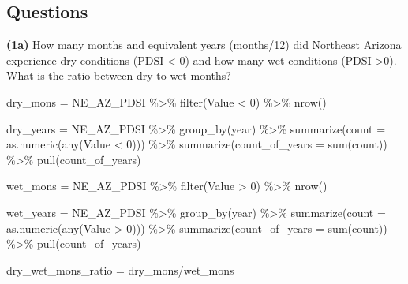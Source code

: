 \documentclass[
  letterpaper,
  DIV=11,
  numbers=noendperiod]{scrartcl}
\newenvironment{Shaded}{\begin{snugshade}}{\end{snugshade}}
\newcommand{\AttributeTok}[1]{\textcolor[rgb]{0.40,0.45,0.13}{#1}}
\newcommand{\DecValTok}[1]{\textcolor[rgb]{0.68,0.00,0.00}{#1}}
\newcommand{\FunctionTok}[1]{\textcolor[rgb]{0.28,0.35,0.67}{#1}}
\newcommand{\NormalTok}[1]{\textcolor[rgb]{0.00,0.23,0.31}{#1}}
\newcommand{\OtherTok}[1]{\textcolor[rgb]{0.00,0.23,0.31}{#1}}
\newcommand{\SpecialCharTok}[1]{\textcolor[rgb]{0.37,0.37,0.37}{#1}}
\begin{document}
\hypertarget{questions}{%
\subsection{Questions}\label{questions}}

\textbf{(1a)} How many months and equivalent years (months/12) did
Northeast Arizona experience dry conditions (PDSI \textless{} 0) and how
many wet conditions (PDSI \textgreater0). What is the ratio between dry
to wet months?

\begin{Shaded}
\begin{Highlighting}[]
\NormalTok{dry\_mons }\OtherTok{=}\NormalTok{ NE\_AZ\_PDSI }\SpecialCharTok{\%\textgreater{}\%} 
  \FunctionTok{filter}\NormalTok{(Value }\SpecialCharTok{\textless{}} \DecValTok{0}\NormalTok{) }\SpecialCharTok{\%\textgreater{}\%} 
  \FunctionTok{nrow}\NormalTok{()}

\NormalTok{dry\_years }\OtherTok{=}\NormalTok{ NE\_AZ\_PDSI }\SpecialCharTok{\%\textgreater{}\%} 
  \FunctionTok{group\_by}\NormalTok{(year) }\SpecialCharTok{\%\textgreater{}\%}
  \FunctionTok{summarize}\NormalTok{(}\AttributeTok{count =} \FunctionTok{as.numeric}\NormalTok{(}\FunctionTok{any}\NormalTok{(Value }\SpecialCharTok{\textless{}} \DecValTok{0}\NormalTok{))) }\SpecialCharTok{\%\textgreater{}\%}
  \FunctionTok{summarize}\NormalTok{(}\AttributeTok{count\_of\_years =} \FunctionTok{sum}\NormalTok{(count)) }\SpecialCharTok{\%\textgreater{}\%} 
  \FunctionTok{pull}\NormalTok{(count\_of\_years)}

\NormalTok{wet\_mons }\OtherTok{=}\NormalTok{ NE\_AZ\_PDSI }\SpecialCharTok{\%\textgreater{}\%} 
  \FunctionTok{filter}\NormalTok{(Value }\SpecialCharTok{\textgreater{}} \DecValTok{0}\NormalTok{) }\SpecialCharTok{\%\textgreater{}\%} 
  \FunctionTok{nrow}\NormalTok{()}

\NormalTok{wet\_years }\OtherTok{=}\NormalTok{ NE\_AZ\_PDSI }\SpecialCharTok{\%\textgreater{}\%} 
  \FunctionTok{group\_by}\NormalTok{(year) }\SpecialCharTok{\%\textgreater{}\%}
  \FunctionTok{summarize}\NormalTok{(}\AttributeTok{count =} \FunctionTok{as.numeric}\NormalTok{(}\FunctionTok{any}\NormalTok{(Value }\SpecialCharTok{\textgreater{}} \DecValTok{0}\NormalTok{))) }\SpecialCharTok{\%\textgreater{}\%}
  \FunctionTok{summarize}\NormalTok{(}\AttributeTok{count\_of\_years =} \FunctionTok{sum}\NormalTok{(count)) }\SpecialCharTok{\%\textgreater{}\%} 
  \FunctionTok{pull}\NormalTok{(count\_of\_years)}

\NormalTok{dry\_wet\_mons\_ratio }\OtherTok{=}\NormalTok{ dry\_mons}\SpecialCharTok{/}\NormalTok{wet\_mons}
\end{Highlighting}
\end{Shaded}
\end{document}
